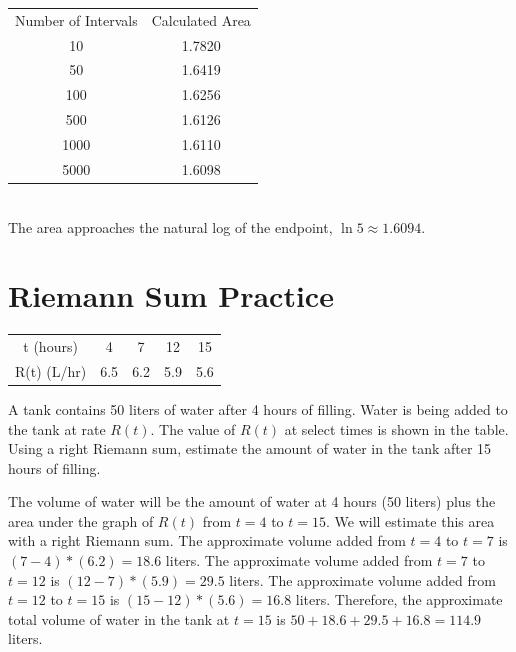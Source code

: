 \begin{Answer}[ref=rsumpython]
	\begin{tabular}{c|c}
		Number of Intervals & Calculated Area \\
		10                  & 1.7820          \\
		50                  & 1.6419          \\
		100                 & 1.6256          \\
		500                 & 1.6126          \\
		1000                & 1.6110          \\
		5000                & 1.6098          \\
	\end{tabular}
	\\The area approaches the natural log of the endpoint, $\ln{5} \approx 1.6094$.
\end{Answer}

\section{Riemann Sum Practice}

\begin{Exercise}[label=rsum2]
	\begin{center}
		\begin{tabular}{c|c|c|c|c}
			t (hours)   & 4   & 7   & 12  & 15  \\
			R(t) (L/hr) & 6.5 & 6.2 & 5.9 & 5.6 \\
		\end{tabular}
	\end{center}
	A tank contains 50 liters of water after 4 hours of filling. Water is being added to the tank at rate $R(t)$. The value of $R(t)$ at select times is shown in the table. Using a right Riemann sum, estimate the amount of water in the tank after 15 hours of filling.
\end{Exercise}

\begin{Answer}[ref=rsum2]
	The volume of water will be the amount of water at 4 hours (50 liters) plus the area under the graph of $R(t)$ from $t=4$ to $t=15$. We will estimate this area with a right Riemann sum. The approximate volume added from $t=4$ to $t=7$ is $(7-4)*(6.2) = 18.6$ liters. The approximate volume added from $t=7$ to $t=12$ is $(12-7)*(5.9)=29.5$ liters. The approximate volume added from $t=12$ to $t=15$ is $(15-12)*(5.6) = 16.8$ liters. Therefore, the approximate total volume of water in the tank at $t=15$ is $50 + 18.6 + 29.5 + 16.8 = 114.9$ liters.
\end{Answer}

